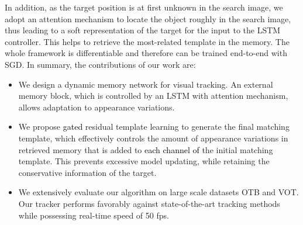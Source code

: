 \documentclass[runningheads]{llncs}
\newcommand{\abc}[1]{\textcolor{black}{#1}}
\begin{document}
In addition, as the target position is at first unknown in the search image, we adopt an attention mechanism to locate the object roughly %
in the search image, thus leading to a soft representation of the target for the input to the LSTM controller. This helps to retrieve the most-related template in the memory. %
%
The whole framework is differentiable and therefore can be trained end-to-end with SGD. In summary, the contributions of our work are:
\begin{itemize}
	\item We design a dynamic memory network for visual tracking. An external memory block, which is controlled by an LSTM with attention mechanism, allows adaptation to appearance variations. %
	\item We propose \abc{gated} residual template learning to generate the final matching template, which effectively controls the amount of appearance variations in retrieved memory that is added to \abc{each channel of} the initial matching template.
	This prevents excessive model updating, while retaining the conservative information of the target.
	\item We extensively evaluate our algorithm on large scale datasets OTB and VOT. Our tracker performs favorably against state-of-the-art tracking methods while possessing real-time speed of 50 fps.
\end{itemize}
\end{document}
